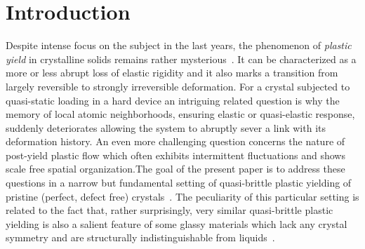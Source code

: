 \documentclass[aps,
superscriptaddress,notitlepage]{revtex4-1}
\begin{document}
 \section{Introduction}
Despite intense focus on the subject  in the last years, the phenomenon of  \emph{plastic yield} in  crystalline  solids  remains rather mysterious~\cite{Zaiser2006-gk,jian2024prediction,ortiz1999plastic,Papanikolaou2017-ld,kosterlitz2016kosterlitz,khantha1997mechanism,hochrainer2014continuum,langer2019statistical,Derlet2016-mp,ispanovity2010submicron}.
 It can be characterized as a  more or less abrupt loss of elastic rigidity and it also marks a transition from largely reversible to strongly irreversible deformation. For a  crystal  subjected to quasi-static loading in a hard device an intriguing   related question is why the memory of  local atomic neighborhoods, ensuring elastic or quasi-elastic response,  suddenly deteriorates allowing  the system  to abruptly sever a  link with its deformation history.  An even more challenging  question  concerns the nature of post-yield plastic flow which often exhibits  intermittent fluctuations and shows  scale free spatial organization.The goal of the present paper is to  address these questions in a  narrow but  fundamental setting  of  quasi-brittle  plastic yielding of  pristine (perfect,  defect free) crystals~\cite{Sethna2017,ghimenti2024shear,Salman2021,perchikov2024,Baggio2023,Baggio2023-qu,Zhang2020-ax}. 
The peculiarity of this particular setting  is related to the fact that, rather surprisingly,  very similar quasi-brittle  plastic yielding  is  also a salient feature  of some  glassy materials which lack any crystal symmetry and are structurally indistinguishable from liquids~\cite{kamani2024brittle,berthier2024yielding,Shang2020,shang2024yielding,singh2020brittle,richard2021brittle,pollard2022yielding,Lin2014-bx,parisi2017shear,derlet2021micro}.
\end{document}

